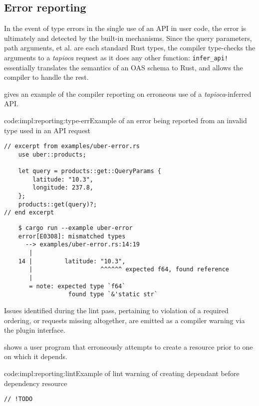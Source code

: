\subsection{Error reporting} \label{impl:reporting}

In the event of type errors in the single use of an API in user code, the error is ultimately and detected by the built-in mechanisms. Since the query parameters, path arguments, et al. are each standard Rust types, the compiler type-checks the arguments to a \emph{tapioca} request as it does any other function: \texttt{infer_api!} essentially translates the semantics of an OAS schema to Rust, and allows the compiler to handle the rest.

 gives an example of the compiler reporting on erroneous use of a \emph{tapioca}-inferred API.

\begin{codelisting}{code:impl:reporting:type-err}{Example of an error being reported from an invalid type used in an API request}
\begin{spacing}{\codespacing}
\begin{verbatim}
// excerpt from examples/uber-error.rs
    use uber::products;
    
    let query = products::get::QueryParams {
        latitude: "10.3",
        longitude: 237.8,
    };
    products::get(query)?;
// end excerpt
\end{verbatim}
\begin{verbatim}
    $ cargo run --example uber-error
    error[E0308]: mismatched types
      --> examples/uber-error.rs:14:19
       |
    14 |         latitude: "10.3",
       |                   ^^^^^^ expected f64, found reference
       |
       = note: expected type `f64`
                  found type `&'static str`
\end{verbatim}
\end{spacing}
\end{codelisting}

Issues identified during the lint pass, pertaining to violation of a required ordering, or requests missing altogether, are emitted as a compiler warning via the plugin interface. 

 shows a user program that erroneously attempts to create a resource prior to one on which it depends.

\begin{codelisting}{code:impl:reporting:lint}{Example of lint warning of creating dependant before dependency resource}
\begin{spacing}{\codespacing}
\begin{verbatim}
// !TODO
\end{verbatim}
\begin{verbatim}
\end{verbatim}
\end{spacing}
\end{codelisting}

